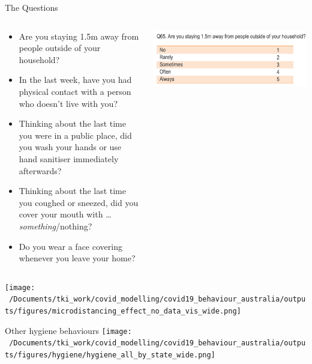 \documentclass[
  ignorenonframetext,
  aspectratio=149,
]{beamer}
\providecommand{\tightlist}{%
  \setlength{\itemsep}{0pt}\setlength{\parskip}{0pt}}\usepackage{longtable,booktabs,array}
\begin{document}
\begin{frame}{The Questions}
\label{the-questions}
\begin{columns}[T]
\begin{column}{0.6\textwidth}
\begin{itemize}
\tightlist
\item
  Are you staying 1.5m away from people outside of your household?
\item
  In the last week, have you had physical contact with a person who
  doesn't live with you?
\item
  Thinking about the last time you were in a public place, did you wash
  your hands or use hand sanitiser immediately afterwards?
\item
  Thinking about the last time you coughed or sneezed, did you cover
  your mouth with \ldots{} \emph{something}/nothing?
\item
  Do you wear a face covering whenever you leave your home?
\end{itemize}
\end{column}

\begin{column}{0.4\textwidth}
\includegraphics{images/questionnaire_example.png}
\end{column}
\end{columns}
\end{frame}

\begin{frame}
\texttt{[image: ~/Documents/tki\_work/covid\_modelling/covid19\_behaviour\_australia/outputs/figures/microdistancing\_effect\_no\_data\_vis\_wide.png]}
\end{frame}

\begin{frame}{Other hygiene behaviours}
\label{other-hygiene-behaviours}
\texttt{[image: ~/Documents/tki\_work/covid\_modelling/covid19\_behaviour\_australia/outputs/figures/hygiene/hygiene\_all\_by\_state\_wide.png]}
\end{frame}
\end{document}
